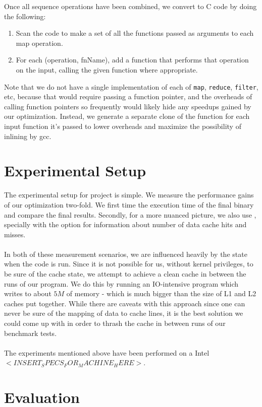 \documentclass[a4paper,twocolumn]{article}
\newcommand{\sml}[1]{\texttt{#1}}
\begin{document}
\noindent
Once all sequence operations have been combined, we convert to C code by doing the following:
\begin{enumerate}
\item Scan the code to make a set of all the functions passed as arguments to each map operation.
\item For each (operation, fnName), add a function that performs that operation on the input, calling the given function where appropriate.
\end{enumerate}
\noindent
Note that we do not have a single implementation of each of \sml{map}, \sml{reduce}, \sml{filter}, etc, because that would require passing a function pointer, and the overheads of calling function pointers so frequently would likely hide any speedups gained by our optimization. Instead, we generate a separate clone of the function for each input function it's passed to lower overheads and maximize the possibility of inlining by gcc.




\section{Experimental Setup}
The experimental setup for project is simple. We measure the performance gains
of our optimization two-fold. We first time the execution time of the final
binary and compare the final results. Secondly, for a more nuanced picture, we
also use , specially with the  option for
information about number of data cache hits and misses.
\\
\\In both of these measurement scenarios, we are influenced heavily by the
state when the code is run. Since it is not possible for us, without kernel
privileges, to be sure of the cache state, we attempt to achieve a clean cache
in between the runs of our program. We do this by running an IO-intensive
program which writes to about $5M$ of memory - which is much bigger than the
size of L1 and L2 caches put together. While there are caveats with this approach
since one can never be sure of the mapping of data to cache lines, it is the
best solution we could come up with in order to thrash the cache in between
runs of our benchmark tests.
\\
\\ The experiments mentioned above have been performed on a Intel
$<INSERT_SPECS_FOR_MACHINE_HERE>$.
\section{Evaluation}
\end{document}

